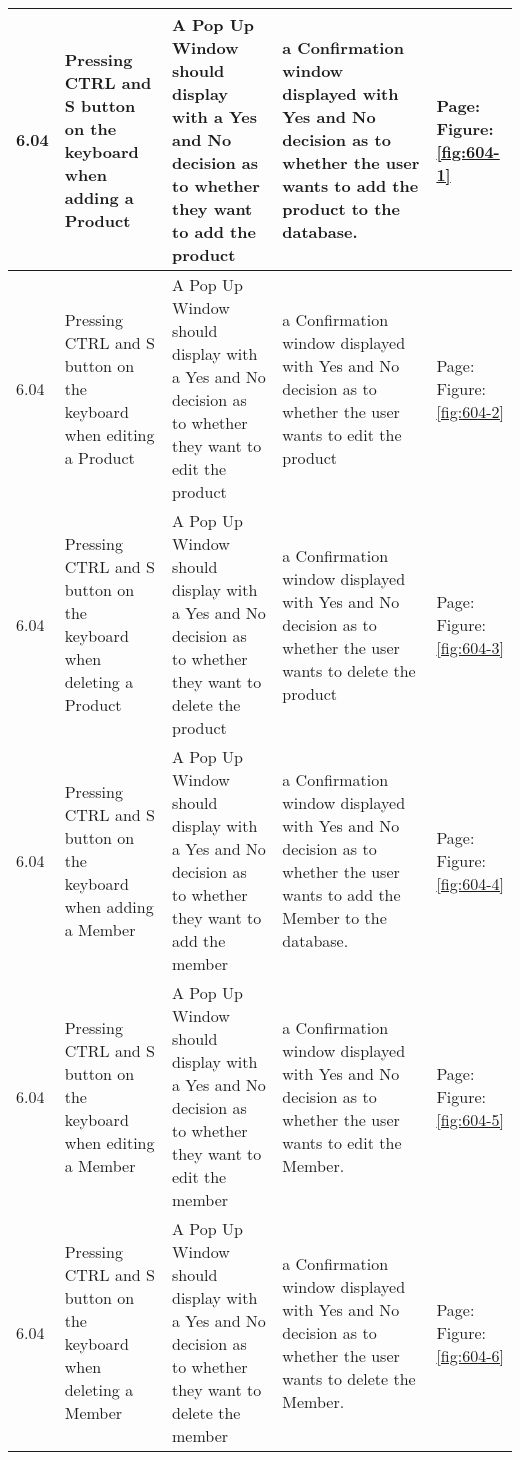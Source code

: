 \begin{flushleft}
\begin{longtable}{|p{1.0cm}|p{2.5cm}|p{3cm}|p{3.0cm}|p{2.5cm}|}
	6.04 & Pressing CTRL and S button on the keyboard when adding a Product & A Pop Up Window should display with a Yes and No decision as to whether they want to add the product & a Confirmation window displayed with Yes and No decision as to whether the user wants to add the product to the database.& Page:\pageref{fig:604-1}  \newline Figure:\ref{fig:604-1}\\ \hline
	6.04 & Pressing CTRL and S button on the keyboard when editing a Product & A Pop Up Window should display with a Yes and No decision as to whether they want to edit the product & a Confirmation window displayed with Yes and No decision as to whether the user wants to edit the product & Page:  \pageref{fig:604-2}  \newline Figure:\ref{fig:604-2}\\ \hline
	6.04 & Pressing CTRL and S button on the keyboard when deleting a Product &A Pop Up Window should display with a Yes and No decision as to whether they want to delete the product & a Confirmation window displayed with Yes and No decision as to whether the user wants to delete the product &   Page:\pageref{fig:604-3}  \newline Figure:\ref{fig:604-3}\\ \hline
	6.04 & Pressing CTRL and S button on the keyboard when adding a Member &A Pop Up Window should display with a Yes and No decision as to whether they want to add the member & a Confirmation window displayed with Yes and No decision as to whether the user wants to add the Member to the database.&   Page:\pageref{fig:604-4}  \newline Figure:\ref{fig:604-4}\\ \hline
	6.04 & Pressing CTRL and S button on the keyboard when editing a Member &A Pop Up Window should display with a Yes and No decision as to whether they want to edit the member & a Confirmation window displayed with Yes and No decision as to whether the user wants to edit the Member.&   Page:\pageref{fig:604-5}  \newline Figure:\ref{fig:604-5}\\ \hline
	6.04 & Pressing CTRL and S button on the keyboard when deleting a Member &A Pop Up Window should display with a Yes and No decision as to whether they want to delete the member & a Confirmation window displayed with Yes and No decision as to whether the user wants to delete the Member.&  
	Page:\pageref{fig:604-6}  \newline Figure:\ref{fig:604-6} \\ \hline

\end{longtable}
\end{flushleft}
